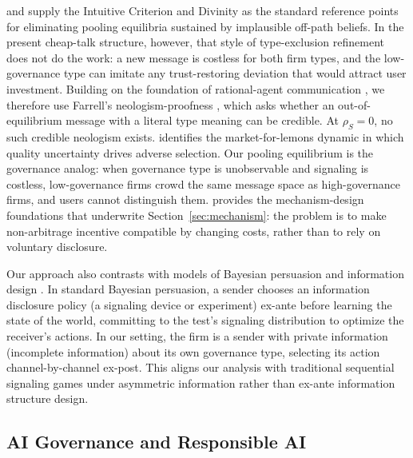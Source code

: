 \citet{cho_kreps1987} and \citet{banks_sobel1987} supply the Intuitive Criterion and Divinity as the standard reference points for eliminating pooling equilibria sustained by implausible off-path beliefs. In the present cheap-talk structure, however, that style of type-exclusion refinement does not do the work: a new message is costless for both firm types, and the low-governance type can imitate any trust-restoring deviation that would attract user investment. Building on the foundation of rational-agent communication \citep{rabin_meaningful_talk1990}, we therefore use Farrell's neologism-proofness \citep{farrell1993}, which asks whether an out-of-equilibrium message with a literal type meaning can be credible. At $\rho_S=0$, no such credible neologism exists. \citet{akerlof1970} identifies the market-for-lemons dynamic in which quality uncertainty drives adverse selection. Our pooling equilibrium is the governance analog: when governance type is unobservable and signaling is costless, low-governance firms crowd the same message space as high-governance firms, and users cannot distinguish them. \citet{myerson1979} provides the mechanism-design foundations that underwrite Section~\ref{sec:mechanism}: the problem is to make non-arbitrage incentive compatible by changing costs, rather than to rely on voluntary disclosure.

Our approach also contrasts with models of Bayesian persuasion \citep{kamenica2011bayesian} and information design \citep{bergemann_morris_information_design2019}. In standard Bayesian persuasion, a sender chooses an information disclosure policy (a signaling device or experiment) ex-ante before learning the state of the world, committing to the test's signaling distribution to optimize the receiver's actions. In our setting, the firm is a sender with private information (incomplete information) about its own governance type, selecting its action channel-by-channel ex-post. This aligns our analysis with traditional sequential signaling games under asymmetric information rather than ex-ante information structure design.


\subsection{AI Governance and Responsible AI}

